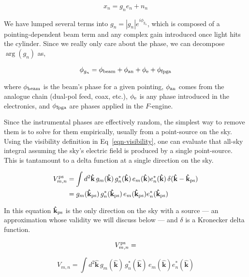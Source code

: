 \begin{equation}
     x_n = g_n e_n + n_n
\end{equation}

\noindent We have lumped several terms into $g_n = |g_n| e^{i \phi_{g_n}}$, 
which is composed of a pointing-dependent beam term
and any complex gain introduced once light hits the cylinder. 
Since we really only care about the phase, we can decompose $\arg(g_n)$
as,

\begin{equation}
\phi_{g_n} = \phi_{\rm beam} + \phi_{\rm an} + \phi_{\rm e} + \phi_{\rm fpga} 
\end{equation}

\noindent where $\phi_{\rm beam}$ is the beam's phase for a given pointing, 
$\phi_{\rm an}$ comes from the analogue chain (dual-pol feed, coax, etc.),  
$\phi_{\rm e}$ is any phase introduced in the electronics, 
and $\phi_{\rm fpga}$ are phases applied in the $F$-engine. 

Since the instrumental phases are effectively random, the simplest 
way to remove them is to solve for them empirically, usually from 
a point-source on the sky. Using the visibility definition in 
Eq~\ref{eqn-visibility}, one can evaluate that all-sky integral 
assuming the sky's electric field is produced by a single point-source. 
This is tantamount to a delta function at a single direction on the sky.

\begin{align}
V^{\rm ps}_{m,n} &= \int d^2\mathbf{\hat{k}} \, g_m(\mathbf{\hat{k}}) \, g^*_n(\mathbf{\hat{k}})\, e_m(\mathbf{\hat{k}}) e_n^*(\mathbf{\hat{k}})\, \delta(\mathbf{\hat{k}} - \mathbf{\hat{k}}_{\rm ps})\\
 &= {g}_m(\mathbf{\hat{k}}_{\rm ps}) \, g^*_n(\mathbf{\hat{k}}_{\rm ps})\,e_m(\mathbf{\hat{k}}_{\rm ps}) e_n^*(\mathbf{\hat{k}}_{\rm ps})
\end{align}

\noindent In this equation $\mathbf{\hat{k}}_{\rm ps}$ is the only direction 
on the sky with a source --- an approximation whose validity we 
will discuss below --- and $\delta$ is a Kronecker delta function. 

\begin{equation}
V_{m, n}^{\rm ps} = 
\end{equation}

\begin{equation}
\label{eqn-visibility}
     V_{m,n} = \int d^2\mathbf{\hat{k}} \,
     g_m(\mathbf{\hat{k}}) \, g^*_n(\mathbf{\hat{k}})\, e_m(\mathbf{\hat{k}}) e_n^*(\mathbf{\hat{k}})
\end{equation}


